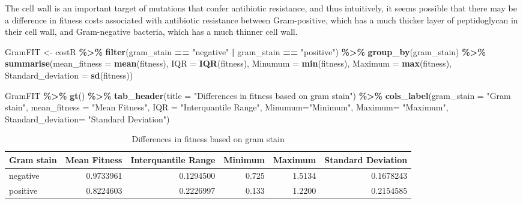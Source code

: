 \documentclass[
]{article}
\newenvironment{Shaded}{\begin{snugshade}}{\end{snugshade}}
\newcommand{\AttributeTok}[1]{\textcolor[rgb]{0.13,0.29,0.53}{#1}}
\newcommand{\FunctionTok}[1]{\textcolor[rgb]{0.13,0.29,0.53}{\textbf{#1}}}
\newcommand{\NormalTok}[1]{#1}
\newcommand{\OtherTok}[1]{\textcolor[rgb]{0.56,0.35,0.01}{#1}}
\newcommand{\SpecialCharTok}[1]{\textcolor[rgb]{0.81,0.36,0.00}{\textbf{#1}}}
\newcommand{\StringTok}[1]{\textcolor[rgb]{0.31,0.60,0.02}{#1}}
\begin{document}
The cell wall is an important target of mutations that confer antibiotic
resistance, and thus intuitively, it seems possible that there may be a
difference in fitness costs associated with antibiotic resistance
between Gram-positive, which has a much thicker layer of peptidoglycan
in their cell wall, and Gram-negative bacteria, which has a much thinner
cell wall.

\begin{Shaded}
\begin{Highlighting}[]
\NormalTok{GramFIT }\OtherTok{\textless{}{-}}\NormalTok{ costR }\SpecialCharTok{\%\textgreater{}\%} 
  \FunctionTok{filter}\NormalTok{(gram\_stain }\SpecialCharTok{==} \StringTok{"negative"} \SpecialCharTok{|}\NormalTok{ gram\_stain }\SpecialCharTok{==} \StringTok{"positive"}\NormalTok{) }\SpecialCharTok{\%\textgreater{}\%}
  \FunctionTok{group\_by}\NormalTok{(gram\_stain) }\SpecialCharTok{\%\textgreater{}\%} 
  \FunctionTok{summarise}\NormalTok{(}\AttributeTok{mean\_fitness =} \FunctionTok{mean}\NormalTok{(fitness),}
            \AttributeTok{IQR =} \FunctionTok{IQR}\NormalTok{(fitness),}
            \AttributeTok{Minumum =} \FunctionTok{min}\NormalTok{(fitness),}
            \AttributeTok{Maximum =} \FunctionTok{max}\NormalTok{(fitness),}
            \AttributeTok{Standard\_deviation =} \FunctionTok{sd}\NormalTok{(fitness))}

\NormalTok{GramFIT }\SpecialCharTok{\%\textgreater{}\%} 
  \FunctionTok{gt}\NormalTok{() }\SpecialCharTok{\%\textgreater{}\%} 
  \FunctionTok{tab\_header}\NormalTok{(}\AttributeTok{title =} \StringTok{"Differences in fitness based on gram stain"}\NormalTok{) }\SpecialCharTok{\%\textgreater{}\%} 
  \FunctionTok{cols\_label}\NormalTok{(}\AttributeTok{gram\_stain =} \StringTok{"Gram stain"}\NormalTok{,}
             \AttributeTok{mean\_fitness =} \StringTok{"Mean Fitness"}\NormalTok{,}
             \AttributeTok{IQR =} \StringTok{"Interquantile Range"}\NormalTok{,}
             \AttributeTok{Minumum=}\StringTok{"Minimum"}\NormalTok{,}
             \AttributeTok{Maximum=} \StringTok{"Maximum"}\NormalTok{,}
             \AttributeTok{Standard\_deviation=} \StringTok{"Standard Deviation"}\NormalTok{)}
\end{Highlighting}
\end{Shaded}

\begin{table}[!t]
\caption*{
{\large Differences in fitness based on gram stain}
} 
\fontsize{12.0pt}{14.4pt}\selectfont
\begin{tabular*}{\linewidth}{@{\extracolsep{\fill}}lrrrrr}
\toprule
Gram stain & Mean Fitness & Interquantile Range & Minimum & Maximum & Standard Deviation \\ 
\midrule\addlinespace[2.5pt]
negative & 0.9733961 & 0.1294500 & 0.725 & 1.5134 & 0.1678243 \\ 
positive & 0.8224603 & 0.2226997 & 0.133 & 1.2200 & 0.2154585 \\ 
\bottomrule
\end{tabular*}
\end{table}
\end{document}
